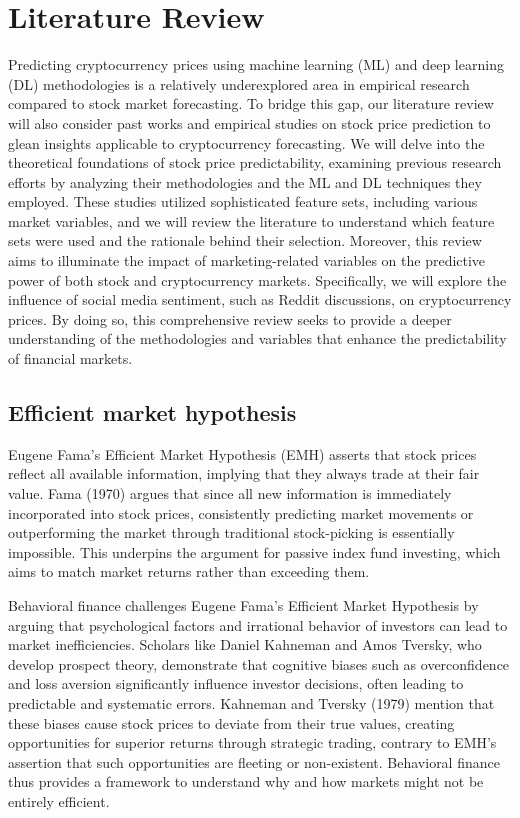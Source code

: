 \chapter{Literature Review}
Predicting cryptocurrency prices using machine learning (ML) and deep learning (DL) methodologies is a relatively underexplored area in empirical research compared to stock market forecasting. To bridge this gap, our literature review will also consider past works and empirical studies on stock price prediction to glean insights applicable to cryptocurrency forecasting.
We will delve into the theoretical foundations of stock price predictability, examining previous research efforts by analyzing their methodologies and the ML and DL techniques they employed. These studies utilized sophisticated feature sets, including various market variables, and we will review the literature to understand which feature sets were used and the rationale behind their selection.
Moreover, this review aims to illuminate the impact of marketing-related variables on the predictive power of both stock and cryptocurrency markets. Specifically, we will explore the influence of social media sentiment, such as Reddit discussions, on cryptocurrency prices. By doing so, this comprehensive review seeks to provide a deeper understanding of the methodologies and variables that enhance the predictability of financial markets.

\section{Efficient market hypothesis}

Eugene Fama's Efficient Market Hypothesis (EMH) asserts that stock prices reflect all available information, implying that they always trade at their fair value. Fama (1970) argues that since all new information is immediately incorporated into stock prices, consistently predicting market movements or outperforming the market through traditional stock-picking is essentially impossible. This underpins the argument for passive index fund investing, which aims to match market returns rather than exceeding them.

Behavioral finance challenges Eugene Fama's Efficient Market Hypothesis by arguing that psychological factors and irrational behavior of investors can lead to market inefficiencies. Scholars like Daniel Kahneman and Amos Tversky, who develop prospect theory, demonstrate that cognitive biases such as overconfidence and loss aversion significantly influence investor decisions, often leading to predictable and systematic errors. Kahneman and Tversky (1979) mention that these biases cause stock prices to deviate from their true values, creating opportunities for superior returns through strategic trading, contrary to EMH’s assertion that such opportunities are fleeting or non-existent. Behavioral finance thus provides a framework to understand why and how markets might not be entirely efficient.

